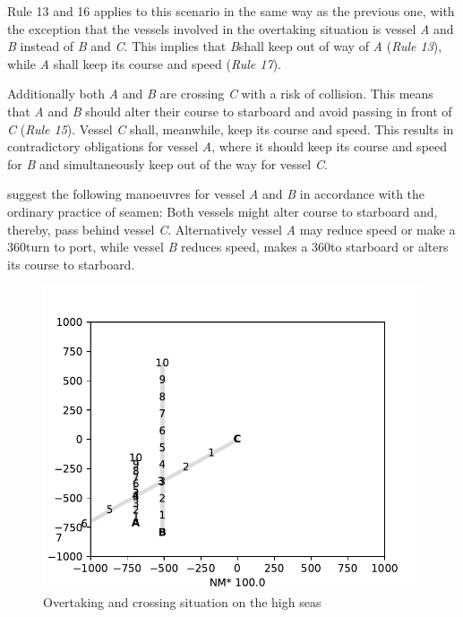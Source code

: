 Rule 13 and 16 applies to this scenario in the same way as the previous one, with the exception that the vessels involved in the overtaking situation is vessel \textit{A} and \textit{B} instead of \textit{B} and \textit{C}. This implies that \textit{B}shall keep out of way of \textit{A} (\textit{Rule 13}), while \textit{A} shall keep its course and speed (\textit{Rule 17}).

Additionally both \textit{A} and \textit{B} are crossing \textit{C} with a risk of collision. This means that \textit{A} and \textit{B} should alter their course to starboard and avoid passing in front of \textit{C} (\textit{Rule 15}). Vessel \textit{C} shall, meanwhile, keep its course and speed. This results in contradictory obligations for vessel  \textit{A}, where it should keep its course and speed for \textit{B} and simultaneously keep out of the way for vessel \textit{C}.

\textcite{ecolreg_overtaking-and-crossing} suggest the following manoeuvres for vessel \textit{A} and \textit{B} in accordance with the ordinary practice of seamen:
Both vessels might alter course to starboard and, thereby, pass behind vessel \textit{C}. Alternatively vessel \textit{A} may reduce speed or make a 360\textdegree turn to port, while vessel \textit{B} reduces speed, makes a 360\textdegree to starboard or alters its course to starboard.

\label{sec:overtaking-and-crossing}
\begin{figure}[H]
    \centering
    \includegraphics[width=\textwidth,height=0.75\textheight,keepaspectratio]{Figures/Scenario/overtaking-and-crossing.pdf}
    \caption{Overtaking and crossing situation on the high seas \cite{ecolreg_overtaking-and-crossing}}
    \label{fig:overtaking-and-crossing}
\end{figure}



